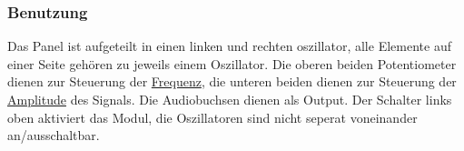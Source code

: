 \subsubsection{Benutzung}
\label{sec:orgb9d356b}
Das Panel ist aufgeteilt in einen linken und rechten oszillator, alle Elemente auf einer Seite gehören zu jeweils einem Oszillator. Die oberen beiden Potentiometer dienen zur Steuerung der \href{file:///home/felixp/Documents/diplomarbeit/dokumentation/content/theoretische\_grundlagen.org}{Frequenz}, die unteren beiden dienen zur Steuerung der \href{file:///home/felixp/Documents/diplomarbeit/dokumentation/content/theoretische\_grundlagen.org}{Amplitude} des Signals. Die Audiobuchsen dienen als Output. Der Schalter links oben aktiviert das Modul, die Oszillatoren sind nicht seperat voneinander an/ausschaltbar.
